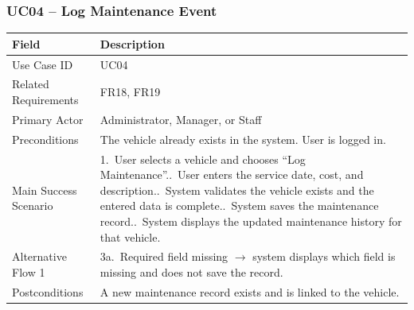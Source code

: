 \documentclass[11pt,a4paper]{article}
\begin{document}
\subsubsection*{UC04 -- Log Maintenance Event}
\begin{longtable}{@{}p{3.2cm}p{11.3cm}@{}}
\toprule
Field & Description \\
\midrule
\endhead
Use Case ID & UC04 \\
Related Requirements & FR18, FR19 \\
Primary Actor & Administrator, Manager, or Staff \\
Preconditions & The vehicle already exists in the system. User is
logged in. \\
Main Success Scenario &
1.\ User selects a vehicle and chooses ``Log Maintenance''.\newline
2.\ User enters the service date, cost, and description.\newline
3.\ System validates the vehicle exists and the entered data is
complete.\newline
4.\ System saves the maintenance record.\newline
5.\ System displays the updated maintenance history for that vehicle. \\
Alternative Flow 1 & 3a.\ Required field missing $\rightarrow$ system
displays which field is missing and does not save the record. \\
Postconditions & A new maintenance record exists and is linked to the
vehicle. \\
\bottomrule
\end{longtable}
\end{document}
